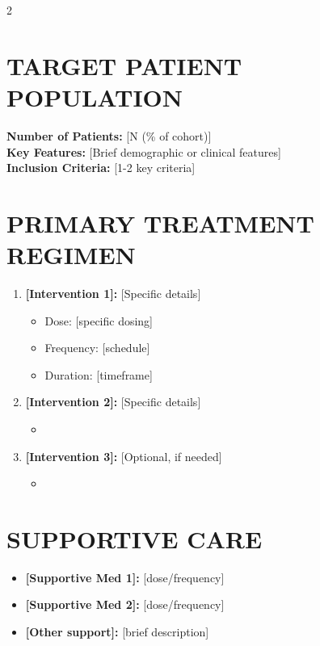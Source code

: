 \documentclass[10pt,letterpaper]{article}
\begin{document}
\begin{multicols}{2}


\section*{TARGET PATIENT POPULATION}
{\small
\textbf{Number of Patients:} [N (\% of cohort)]\\
\textbf{Key Features:} [Brief demographic or clinical features]\\
\textbf{Inclusion Criteria:} [1-2 key criteria]
}

\section*{PRIMARY TREATMENT REGIMEN}
{\small
\begin{enumerate}[leftmargin=12pt]
    \item \textbf{[Intervention 1]:} [Specific details]
    \begin{itemize}
        \item Dose: [specific dosing]
        \item Frequency: [schedule]
        \item Duration: [timeframe]
    \end{itemize}

    \item \textbf{[Intervention 2]:} [Specific details]
    \begin{itemize}
        \item [Key parameters]
    \end{itemize}

    \item \textbf{[Intervention 3]:} [Optional, if needed]
    \begin{itemize}
        \item [Key parameters]
    \end{itemize}
\end{enumerate}
}

\section*{SUPPORTIVE CARE}
{\small
\begin{itemize}
    \item \textbf{[Supportive Med 1]:} [dose/frequency]
    \item \textbf{[Supportive Med 2]:} [dose/frequency]
    \item \textbf{[Other support]:} [brief description]
\end{itemize}
}


\end{multicols}
\end{document}

